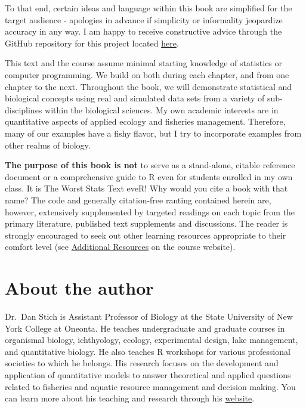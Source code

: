 \documentclass[
]{book}
\begin{document}
To that end, certain ideas and language within this book are simplified for the target audience - apologies in advance if simplicity or informality jeopardize accuracy in any way. I am happy to receive constructive advice through the GitHub repository for this project located \href{https://github.com/danStich/worst-r}{here}.

This text and the course assume minimal starting knowledge of statistics or computer programming. We build on both during each chapter, and from one chapter to the next. Throughout the book, we will demonstrate statistical and biological concepts using real and simulated data sets from a variety of sub-disciplines within the biological sciences. My own academic interests are in quantitative aspects of applied ecology and fisheries management. Therefore, many of our examples have a fishy flavor, but I try to incorporate examples from other realms of biology.

\textbf{The purpose of this book is not} to serve as a stand-alone, citable reference document or a comprehensive guide to R even for students enrolled in my own class. It is The Worst Stats Text eveR! Why would you cite a book with that name? The code and generally citation-free ranting contained herein are, however, extensively supplemented by targeted readings on each topic from the primary literature, published text supplements and discussions. The reader is strongly encouraged to seek out other learning resources appropriate to their comfort level (see \href{https://danstich.github.io/stich/classes/BIOL217/index.html}{Additional Resources} on the course website).

\hypertarget{author}{%
\chapter*{About the author}\label{author}}

Dr.~Dan Stich is Assistant Professor of Biology at the State University of New York College at Oneonta. He teaches undergraduate and graduate courses in organismal biology, ichthyology, ecology, experimental design, lake management, and quantitative biology. He also teaches R workshops for various professional societies to which he belongs. His research focuses on the development and application of quantitative models to answer theoretical and applied questions related to fisheries and aquatic resource management and decision making. You can learn more about his teaching and research through his \href{https://danstich.github.io/stich/index.html}{website}.
\end{document}
